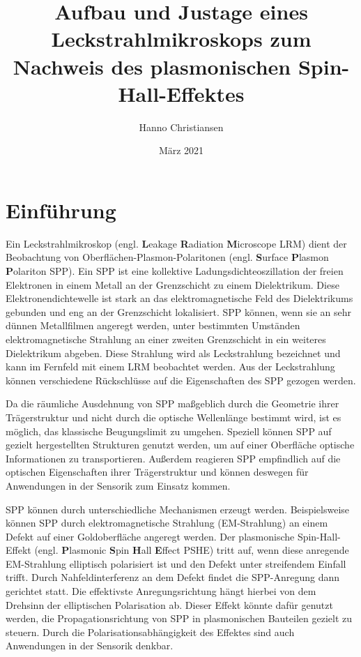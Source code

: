 \documentclass[titlepage,  ngerman]{article}
\title{Aufbau und Justage eines Leckstrahlmikroskops zum Nachweis des plasmonischen Spin-Hall-Effektes}
\author{Hanno Christiansen}
\date{März 2021}
\begin{document}
	
	\maketitle
	\tableofcontents
	\newpage
	\listoffigures 
	\newpage
	
	\section{Einführung}
	Ein Leckstrahlmikroskop (engl. \textbf{L}eakage \textbf{R}adiation \textbf{M}icroscope LRM) dient der Beobachtung von Oberflächen-Plasmon-Polaritonen (engl. \textbf{S}urface \textbf{P}lasmon \textbf{P}olariton SPP). Ein SPP ist eine kollektive Ladungsdichteoszillation der freien Elektronen in einem Metall an der Grenzschicht zu einem Dielektrikum. Diese Elektronendichtewelle ist stark an das elektromagnetische Feld des Dielektrikums gebunden und eng an der Grenzschicht lokalisiert. SPP können, wenn sie an sehr dünnen Metallfilmen angeregt werden, unter bestimmten Umständen elektromagnetische Strahlung an einer zweiten Grenzschicht in ein weiteres Dielektrikum abgeben. Diese Strahlung wird als Leckstrahlung bezeichnet und kann im Fernfeld mit einem LRM beobachtet werden. Aus der Leckstrahlung können verschiedene Rückschlüsse auf die Eigenschaften des SPP gezogen werden.\cite{Drezet.2008}
	
	Da die räumliche Ausdehnung von SPP maßgeblich durch die Geometrie ihrer Trägerstruktur und nicht durch die optische Wellenlänge bestimmt wird, ist es möglich, das klassische Beugungslimit zu umgehen. Speziell können SPP auf gezielt hergestellten Strukturen genutzt werden, um auf einer Oberfläche optische Informationen zu transportieren. Außerdem reagieren SPP empfindlich auf die optischen Eigenschaften ihrer Trägerstruktur und können deswegen für Anwendungen in der Sensorik zum Einsatz kommen.\cite{Lin.2013}
	
	SPP können durch unterschiedliche Mechanismen erzeugt werden. Beispielsweise können SPP durch elektromagnetische Strahlung (EM-Strahlung) an einem Defekt auf einer Goldoberfläche angeregt werden. Der plasmonische Spin-Hall-Effekt (engl. \textbf{P}lasmonic \textbf{S}pin \textbf{H}all \textbf{E}ffect PSHE) tritt auf, wenn diese anregende EM-Strahlung elliptisch polarisiert ist und den Defekt unter streifendem Einfall trifft. Durch Nahfeldinterferenz an dem Defekt findet die SPP-Anregung dann gerichtet statt. Die effektivste Anregungsrichtung hängt hierbei von dem Drehsinn der elliptischen Polarisation ab. Dieser Effekt könnte dafür genutzt werden, die Propagationsrichtung von SPP in plasmonischen Bauteilen gezielt zu steuern. Durch die Polarisationsabhängigkeit des Effektes sind auch Anwendungen in der Sensorik denkbar.\cite{RodriguezFortuno.2013}
	
\end{document}
